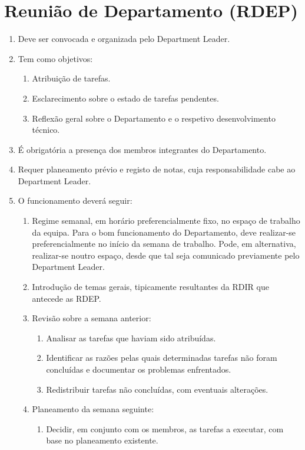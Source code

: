 \section{Reunião de Departamento (RDEP)}
\begin{enumerate}
  \item Deve ser convocada e organizada pelo Department Leader.
  \item Tem como objetivos:
  \begin{enumerate}
    \item Atribuição de tarefas.
    \item Esclarecimento sobre o estado de tarefas pendentes.
    \item Reflexão geral sobre o Departamento e o respetivo desenvolvimento técnico.
  \end{enumerate}
  \item É obrigatória a presença dos membros integrantes do Departamento.
  \item Requer planeamento prévio e registo de notas, cuja responsabilidade cabe ao Department Leader.
  \item O funcionamento deverá seguir:
  \begin{enumerate}
    \item Regime semanal, em horário preferencialmente fixo, no espaço de trabalho da equipa. Para o bom funcionamento do Departamento, deve realizar-se preferencialmente no início da semana de trabalho. Pode, em alternativa, realizar-se noutro espaço, desde que tal seja comunicado previamente pelo Department Leader.
    \item Introdução de temas gerais, tipicamente resultantes da RDIR que antecede as RDEP.
    \item Revisão sobre a semana anterior:
    \begin{enumerate}
      \item Analisar as tarefas que haviam sido atribuídas.
      \item Identificar as razões pelas quais determinadas tarefas não foram concluídas e documentar os problemas enfrentados.
      \item Redistribuir tarefas não concluídas, com eventuais alterações.
    \end{enumerate}
    \item Planeamento da semana seguinte:
    \begin{enumerate}
      \item Decidir, em conjunto com os membros, as tarefas a executar, com base no planeamento existente.

\end{enumerate}
\end{enumerate}
\end{enumerate}
